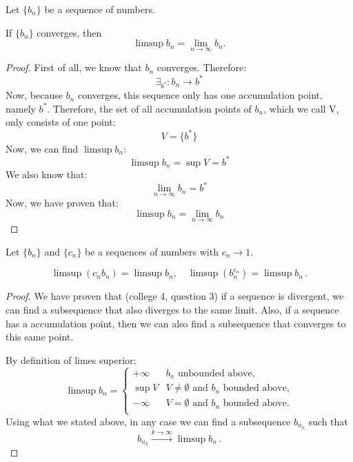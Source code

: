 \documentclass[week=11]{homework}
\date{\today}
\begin{document}
    \maketitle
    \thispagestyle{empty}
    \newpage
    \begin{questions}
		\let\firstquestion\question
		\renewcommand*{\question}{\vspace{7mm}\firstquestion}
        \firstquestion
		Let $\{b_n \}$ be a sequence of numbers. 
		\begin{toprove}
			If $\{b_n \}$ converges, then 
			\[
				\limsup b_n = \lim_{n \to \infty} b_n.
			\]
		\end{toprove}
		\begin{proof}
			First of all, we know that $b_n$ converges. Therefore:
			\[
				\exists_{b^*}: b_n \to b^*
			\]
			Now, because $b_n$ converges, this sequence only has one accumulation point, namely $b^*$. Therefore, the set of all accumulation points of $b_n$, which we call V, only consists of one point: 
			\[
				V = \{b^*\}
			\]
			Now, we can find $\limsup b_n$:
			\[
				\limsup b_n = \sup V = b^*
			\]
			We also know that:
			\[
				\lim_{n \to \infty} b_n = b^*
			\]
			Now, we have proven that:
			\[
				\limsup b_n = \lim_{n \to \infty} b_n
			\]
		\end{proof}
		\question
		Let $\{b_n \}$ and $\{c_n \}$ be a sequences of numbers with $c_n \to 1$. 
		\begin{toprove}
			\[
				\limsup (c_n b_n) = \limsup b_n, \quad \limsup (b_n^{c_n}) = \limsup b_n\,.
			\]
		\end{toprove}
		\begin{proof}
			We have proven that (college 4, question 3) if a sequence is divergent, we can find a subsequence that also diverges to the same limit. Also, if a sequence has a accumulation point, then we can also find a subsequence that converges to this same point.
			
			By definition of limes superior;
			\[
				\limsup b_n = 
				\begin{cases}
					+\infty & b_n \text{ unbounded above,} \\
					\sup V & V \neq \emptyset \text{ and } b_n \text{ bounded above,} \\
					-\infty & V = \emptyset \text{ and } b_n \text{ bounded above.} \\
				\end{cases}
			\]
			Using what we stated above, in any case we can find a subsequence $b_{n_k}$ such that
			\begin{equation} \label{subsequence_to_limsup} \tag{$\star$}
				b_{n_k} \xrightarrow{k\to\infty} \limsup b_n\,.
			\end{equation}
			

\end{proof}
\end{questions}
\end{document}
